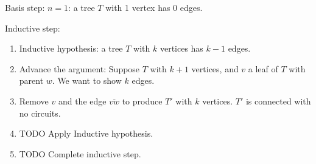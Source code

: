 Basis step: $n = 1$: a tree $T$ with 1 vertex has 0 edges.

Inductive step:

\begin{enumerate}
  \item Inductive hypothesis: a tree $T$ with $k$ vertices has $k-1$
    edges.

  \item Advance the argument: Suppose $T$ with $k+1$ vertices, and $v$ a
    leaf of $T$ with parent $w$. We want to show $k$ edges.

  \item Remove $v$ and the edge $\overline{vw}$ to produce $T'$ with $k$
    vertices. $T'$ is connected with no circuits.
  \item TODO Apply Inductive hypothesis.
  \item TODO Complete inductive step.
\end{enumerate}
